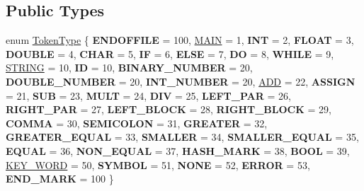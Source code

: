 \subsection*{Public Types}
\begin{DoxyCompactItemize}
\item 
enum \hyperlink{class_scanner_a1d588ca5cfd26bdff0e59b437da5b166}{Token\+Type} \{ \newline
{\bfseries E\+N\+D\+O\+F\+F\+I\+LE} = 100, 
\hyperlink{class_scanner_a1d588ca5cfd26bdff0e59b437da5b166a3c7eaa7bbd93e4114909ec587d548f03}{M\+A\+IN} = 1, 
{\bfseries I\+NT} = 2, 
{\bfseries F\+L\+O\+AT} = 3, 
\newline
{\bfseries D\+O\+U\+B\+LE} = 4, 
{\bfseries C\+H\+AR} = 5, 
{\bfseries IF} = 6, 
{\bfseries E\+L\+SE} = 7, 
\newline
{\bfseries DO} = 8, 
{\bfseries W\+H\+I\+LE} = 9, 
\hyperlink{class_scanner_a1d588ca5cfd26bdff0e59b437da5b166a6cb18bf224cf14b443dde68cc98fa804}{S\+T\+R\+I\+NG} = 10, 
{\bfseries ID} = 10, 
\newline
{\bfseries B\+I\+N\+A\+R\+Y\+\_\+\+N\+U\+M\+B\+ER} = 20, 
{\bfseries D\+O\+U\+B\+L\+E\+\_\+\+N\+U\+M\+B\+ER} = 20, 
{\bfseries I\+N\+T\+\_\+\+N\+U\+M\+B\+ER} = 20, 
\hyperlink{class_scanner_a1d588ca5cfd26bdff0e59b437da5b166a92075cf0b9bcb96f062e94a3b84c6c73}{A\+DD} = 22, 
\newline
{\bfseries A\+S\+S\+I\+GN} = 21, 
{\bfseries S\+UB} = 23, 
{\bfseries M\+U\+LT} = 24, 
{\bfseries D\+IV} = 25, 
\newline
{\bfseries L\+E\+F\+T\+\_\+\+P\+AR} = 26, 
{\bfseries R\+I\+G\+H\+T\+\_\+\+P\+AR} = 27, 
{\bfseries L\+E\+F\+T\+\_\+\+B\+L\+O\+CK} = 28, 
{\bfseries R\+I\+G\+H\+T\+\_\+\+B\+L\+O\+CK} = 29, 
\newline
{\bfseries C\+O\+M\+MA} = 30, 
{\bfseries S\+E\+M\+I\+C\+O\+L\+ON} = 31, 
{\bfseries G\+R\+E\+A\+T\+ER} = 32, 
{\bfseries G\+R\+E\+A\+T\+E\+R\+\_\+\+E\+Q\+U\+AL} = 33, 
\newline
{\bfseries S\+M\+A\+L\+L\+ER} = 34, 
{\bfseries S\+M\+A\+L\+L\+E\+R\+\_\+\+E\+Q\+U\+AL} = 35, 
{\bfseries E\+Q\+U\+AL} = 36, 
{\bfseries N\+O\+N\+\_\+\+E\+Q\+U\+AL} = 37, 
\newline
{\bfseries H\+A\+S\+H\+\_\+\+M\+A\+RK} = 38, 
{\bfseries B\+O\+OL} = 39, 
\hyperlink{class_scanner_a1d588ca5cfd26bdff0e59b437da5b166a57fa4cabbebd964ade8ea1ca070ac7b4}{K\+E\+Y\+\_\+\+W\+O\+RD} = 50, 
{\bfseries S\+Y\+M\+B\+OL} = 51, 
\newline
{\bfseries N\+O\+NE} = 52, 
{\bfseries E\+R\+R\+OR} = 53, 
{\bfseries E\+N\+D\+\_\+\+M\+A\+RK} = 100
 \}
\end{DoxyCompactItemize}
